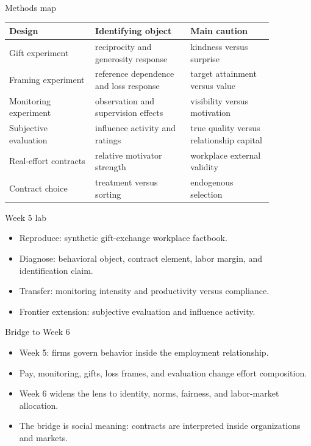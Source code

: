 \documentclass[aspectratio=169,11pt]{beamer}
\begin{document}
\begin{frame}{Methods map}
\scriptsize
\begin{tabular}{p{0.28\linewidth} p{0.31\linewidth} p{0.27\linewidth}}
\toprule
Design & Identifying object & Main caution \\
\midrule
Gift experiment & reciprocity and generosity response & kindness versus surprise \\
Framing experiment & reference dependence and loss response & target attainment versus value \\
Monitoring experiment & observation and supervision effects & visibility versus motivation \\
Subjective evaluation & influence activity and ratings & true quality versus relationship capital \\
Real-effort contracts & relative motivator strength & workplace external validity \\
Contract choice & treatment versus sorting & endogenous selection \\
\bottomrule
\end{tabular}
\end{frame}

\begin{frame}{Week 5 lab}
\begin{itemize}
    \item Reproduce: synthetic gift-exchange workplace factbook.
    \item Diagnose: behavioral object, contract element, labor margin, and identification claim.
    \item Transfer: monitoring intensity and productivity versus compliance.
    \item Frontier extension: subjective evaluation and influence activity.
\end{itemize}
\end{frame}

\begin{frame}{Bridge to Week 6}
\begin{itemize}
    \item Week 5: firms govern behavior inside the employment relationship.
    \item Pay, monitoring, gifts, loss frames, and evaluation change effort composition.
    \item Week 6 widens the lens to identity, norms, fairness, and labor-market allocation.
    \item The bridge is social meaning: contracts are interpreted inside organizations and markets.
\end{itemize}
\end{frame}
\end{document}
